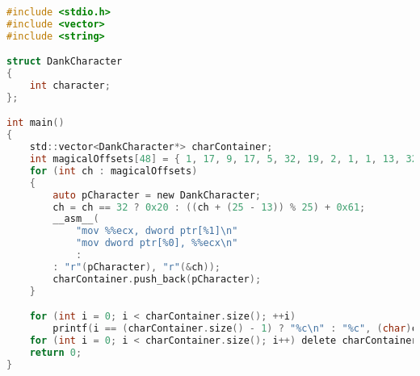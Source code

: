 \headerfooteroff{}
\pagecolor{black!5}\afterpage{\nopagecolor}
\begin{lstlisting}[language=C]
#include <stdio.h>
#include <vector>
#include <string>

struct DankCharacter
{
	int character;
};

int main()
{
	std::vector<DankCharacter*> charContainer;
	int magicalOffsets[48] = { 1, 17, 9, 17, 5, 32, 19, 2, 1, 1, 13, 32, 19, 21, 9, 17, 32, 12, 2, 8, 32, 8, 3, 32, 1, 17, 9, 17, 5, 32, 19, 2, 1, 1, 13, 32, 24, 17, 7, 32, 12, 2, 8, 32, 16, 2, 10, 1 };
	for (int ch : magicalOffsets)
	{
		auto pCharacter = new DankCharacter;
		ch = ch == 32 ? 0x20 : ((ch + (25 - 13)) % 25) + 0x61;
		__asm__(
			"mov %%ecx, dword ptr[%1]\n"
			"mov dword ptr[%0], %%ecx\n"
			:
		: "r"(pCharacter), "r"(&ch));
		charContainer.push_back(pCharacter);
	}

	for (int i = 0; i < charContainer.size(); ++i)
		printf(i == (charContainer.size() - 1) ? "%c\n" : "%c", (char)charContainer[i]->character);
	for (int i = 0; i < charContainer.size(); i++) delete charContainer[i];
	return 0;
}
\end{lstlisting}
\clearpage
\headerfooteron{}
